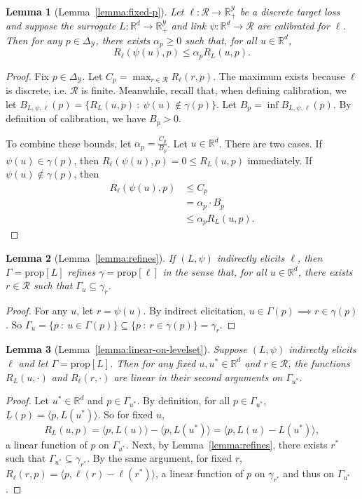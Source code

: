 \documentclass{article}
\newtheorem*{lemma*}{Lemma}
\theoremstyle{definition}\newtheorem{definition}{Definition}
\theoremstyle{definition}\newtheorem{assumption}{Assumption}
\newcommand{\reals}{\mathbb{R}}
\newcommand{\prop}[1]{\mathrm{prop}[#1]}
\newcommand{\simplex}{\Delta_\Y}
\newcommand{\R}{\mathcal{R}}
\newcommand{\Y}{\mathcal{Y}}
\newcommand{\risk}[1]{\underline{#1}}
\newcommand{\inprod}[2]{\langle #1, #2 \rangle}%
\begin{document}
\begin{lemma*}[Lemma~\ref{lemma:fixed-p}]
  Let $\ell: \R \to \reals_+^{\Y}$ be a discrete target loss and suppose the surrogate $L: \reals^d \to \reals_+^{\Y}$ and link $\psi: \reals^d \to \R$ are calibrated for $\ell$.
  Then for any $p \in \simplex$, there exists $\alpha_p \geq 0$ such that, for all $u \in \reals^d$,
    \[ R_{\ell}(\psi(u),p) \leq \alpha_p R_L(u,p) . \]
\end{lemma*}
\begin{proof}
  Fix $p \in \simplex$.
  Let $C_p = \max_{r \in \R} R_{\ell}(r,p)$.
  The maximum exists because $\ell$ is discrete, i.e. $\R$ is finite.
  Meanwhile, recall that, when defining calibration, we let $B_{L,\psi,\ell}(p) = \{R_L(u,p) ~:~ \psi(u) \not\in \gamma(p)\}$.
  Let $B_p = \inf B_{L,\psi,\ell}(p)$.
  By definition of calibration, we have $B_p > 0$.

  To combine these bounds, let $\alpha_p = \frac{C_p}{B_p}$.
  Let $u \in \reals^d$.
  There are two cases.
  If $\psi(u) \in \gamma(p)$, then $R_{\ell}(\psi(u),p) = 0 \leq R_L(u,p)$ immediately.
  If $\psi(u) \not\in \gamma(p)$, then
  \begin{align*}
    R_{\ell}(\psi(u),p)
    &\leq C_p \\
    &=    \alpha_p \cdot B_p  \\
    &\leq \alpha_p R_L(u,p) .
  \end{align*}
\end{proof}

\begin{lemma*}[Lemma~\ref{lemma:refines}]
  If $(L,\psi)$ indirectly elicits $\ell$, then $\Gamma = \prop{L}$ \emph{refines} $\gamma = \prop{\ell}$ in the sense that, for all $u \in \reals^d$, there exists $r \in \R$ such that $\Gamma_u \subseteq \gamma_r$.
\end{lemma*}
\begin{proof}
  For any $u$, let $r = \psi(u)$.
  By indirect elicitation, $u \in \Gamma(p) \implies r \in \gamma(p)$.
  So $\Gamma_u = \{p ~:~ u \in \Gamma(p)\} \subseteq \{p ~:~ r \in \gamma(p)\} = \gamma_r$.
\end{proof}

\begin{lemma*}[Lemma~\ref{lemma:linear-on-levelset}]
  Suppose $(L,\psi)$ indirectly elicits $\ell$ and let $\Gamma = \prop{L}$.
  Then for any fixed $u,u^* \in \reals^d$ and $r \in \R$, the functions $R_L(u,\cdot)$ and $R_{\ell}(r,\cdot)$ are linear in their second arguments on $\Gamma_{u^*}$.
\end{lemma*}
\begin{proof}
  Let $u^* \in \reals^d$ and $p \in \Gamma_{u^*}$.
  By definition, for all $p \in \Gamma_{u^*}$, $\risk{L}(p) = \inprod{p}{L(u^*)}$.
  So for fixed $u$,
    \[ R_L(u,p) = \inprod{p}{L(u)} - \inprod{p}{L(u^*)} = \inprod{p}{L(u) - L(u^*)} , \]
  a linear function of $p$ on $\Gamma_{u^*}$.
  Next, by Lemma~\ref{lemma:refines}, there exists $r^*$ such that $\Gamma_{u^*} \subseteq \gamma_{r^*}$.
  By the same argument, for fixed $r$, $R_{\ell}(r,p) = \inprod{p}{\ell(r) - \ell(r^*)}$, a linear function of $p$ on $\gamma_{r^*}$ and thus on $\Gamma_{u^*}$.
\end{proof}
\end{document}
